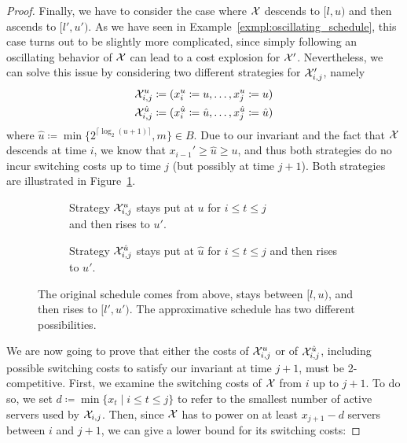 \begin{proof}
Finally, we have to consider the case where $\mathcal{X}$ descends to $[l,u)$ and then ascends to $[l',u')$. As we have seen in Example~\ref{exmpl:oscillating_schedule}, this case turns out to be slightly more complicated, since simply following an oscillating behavior of $\mathcal{X}$ can lead to a cost explosion for $\mathcal{X}'$. Nevertheless, we can solve this issue by considering two different strategies for $\mathcal{X}_{i,j}'$, namely
\begin{align*}
	\mathcal{X}_{i,j}^u&\coloneqq(x_i^u\coloneqq u,\dotsc,x_j^u\coloneqq u)\\
	\mathcal{X}_{i,j}^{\hat{u}}&\coloneqq(x_i^{\hat{u}}\coloneqq\hat{u},\dotsc,x_j^{\hat{u}}\coloneqq\hat{u})
\end{align*}
where $\hat{u}\coloneqq\min\{2^{\lceil\log_2(u+1)\rceil},m\}\in B$. Due to our invariant and the fact that $\mathcal{X}$ descends at time $i$, we know that $x_{i-1}'\ge \hat{u}\ge u$, and thus both strategies do no incur switching costs up to time $j$ (but possibly at time $j+1$). Both strategies are illustrated in Figure~\ref{fig:schedule_behavior_down_up}.
\begin{figure}[H]
\captionsetup[subfigure]{labelformat=empty}
\begin{subfigure}[b]{0.49\textwidth}

\caption{Strategy $\mathcal{X}_{i,j}^u$ stays put at $u$ for $i\le t\le j$\\and then rises to $u'$.}
\end{subfigure}
\hfill
\begin{subfigure}[b]{0.49\textwidth}

\caption{Strategy $\mathcal{X}_{i,j}^{\hat{u}}$ stays put at $\hat{u}$ for $i\le t\le j$ and then rises to $u'$.}
\end{subfigure}
\caption{The original schedule comes from above, stays between $[l,u)$, and then rises to $[l',u')$. The approximative schedule has two different possibilities.}
\label{fig:schedule_behavior_down_up}
\end{figure}
We are now going to prove that either the costs of $\mathcal{X}_{i,j}^u$ or of $\mathcal{X}_{i,j}^{\hat{u}}$, including possible switching costs to satisfy our invariant at time $j+1$, must be 2-competitive. 
First, we examine the switching costs of $\mathcal{X}$ from $i$ up to $j+1$. To do so, we set $d\coloneqq\min\{x_t\mid i\le t\le j\}$ to refer to the smallest number of active servers used by $\mathcal{X}_{i,j}$. Then, since $\mathcal{X}$ has to power on at least $x_{j+1}-d$ servers between $i$ and $j+1$, we can give a lower bound for its switching costs:

\end{proof}
